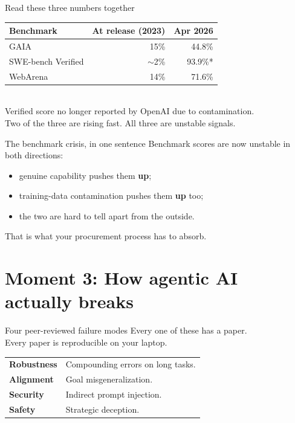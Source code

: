 \documentclass[aspectratio=169, 12pt, xcolor={dvipsnames,table}]{beamer}
\begin{document}
\begin{frame}{Read these three numbers together}
  \vfill
  \centering
  \begin{tabular}{lrr}
    \toprule
    \textbf{Benchmark} & \textbf{At release (2023)} & \textbf{Apr 2026}\\
    \midrule
    GAIA          & 15\%  & 44.8\%\\
    SWE-bench Verified & $\sim$2\%  & 93.9\%*\\
    WebArena      & 14\%  & 71.6\%\\
    \bottomrule
  \end{tabular}\\[1em]
  {\color{mute}\small * Verified score no longer reported by OpenAI due to contamination.}\\[1em]
  {\Large Two of the three are rising fast. All three are {\color{accent}unstable signals}.}
  \vfill
\end{frame}

\begin{frame}{The benchmark crisis, in one sentence}
  \vfill
  \centering
  {\Large Benchmark scores are now unstable in {\color{accent}both} directions:}\\[1em]
  \begin{itemize}\setlength\itemsep{0.5em}
    \item genuine capability pushes them \textbf{up};
    \item training-data contamination pushes them \textbf{up} too;
    \item the two are hard to tell apart from the outside.
  \end{itemize}
  \vspace{1em}
  {\Large That is what your procurement process has to absorb.}
  \vfill
\end{frame}

\section{Moment 3: How agentic AI actually breaks}

\begin{frame}{Four peer-reviewed failure modes}
  \vfill
  \centering
  {\Large Every one of these has a paper.}\\[0.3em]
  {\Large Every paper is reproducible on your laptop.}\\[1.5em]
  \begin{tabular}{ll}
    \textbf{Robustness} & Compounding errors on long tasks.\\[0.3em]
    \textbf{Alignment}  & Goal misgeneralization.\\[0.3em]
    \textbf{Security}   & Indirect prompt injection.\\[0.3em]
    \textbf{Safety}     & Strategic deception.\\
  \end{tabular}
  \vfill
\end{frame}
\end{document}
